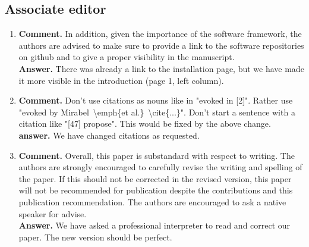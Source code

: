 \documentclass{article}
\begin{document}
\subsection*{Associate editor}
\begin{enumerate}
\item \textbf{Comment.} In addition, given the importance of the
  software framework, the authors are advised to make sure to provide
  a link to the software repositories on github and to give a proper
  visibility in the manuscript.\\ \textbf{Answer.} There was already a
  link to the installation page, but we have made it more visible in
  the introduction (page 1, left column).

\item \textbf{Comment.} Don't use citations as nouns like in "evoked
  in [2]". Rather use "evoked by Mirabel~\textbackslash emph\{et al.\}~\textbackslash cite\{...\}".
  Don't start a sentence with a citation like "[47] propose". This
  would be fixed by the above change.\\
  \textbf{answer.} We have changed citations as requested.

\item \textbf{Comment.}  Overall, this paper is substandard with
  respect to writing. The authors are strongly encouraged to carefully
  revise the writing and spelling of the paper. If this should not be
  corrected in the revised version, this paper will not be recommended
  for publication despite the contributions and this publication
  recommendation. The authors are encouraged to ask a native speaker
  for advise.\\ \textbf{Answer.} %
  We have asked a professional interpreter to read and correct our
  paper. The new version should be perfect.
\end{enumerate}
\end{document}
